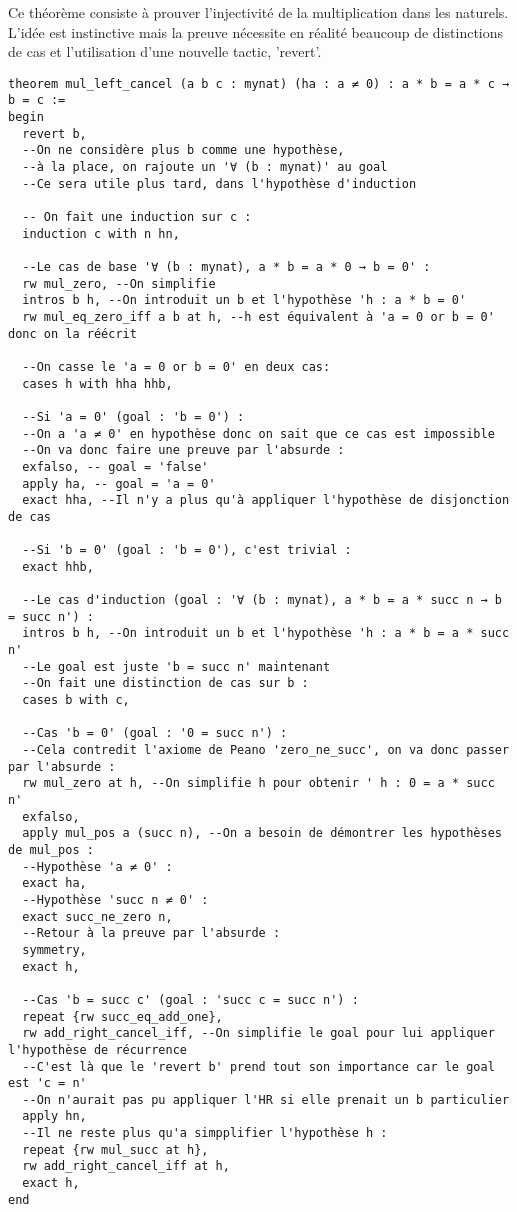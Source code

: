 Ce théorème consiste à prouver l'injectivité de la multiplication dans les naturels.
L'idée est instinctive mais la preuve nécessite en réalité beaucoup de distinctions de cas et l'utilisation d'une nouvelle tactic, 'revert'.
\begin{verbatim}
theorem mul_left_cancel (a b c : mynat) (ha : a ≠ 0) : a * b = a * c → b = c :=
begin
  revert b,
  --On ne considère plus b comme une hypothèse,
  --à la place, on rajoute un '∀ (b : mynat)' au goal
  --Ce sera utile plus tard, dans l'hypothèse d'induction
  
  -- On fait une induction sur c :
  induction c with n hn,

  --Le cas de base '∀ (b : mynat), a * b = a * 0 → b = 0' :
  rw mul_zero, --On simplifie
  intros b h, --On introduit un b et l'hypothèse 'h : a * b = 0'
  rw mul_eq_zero_iff a b at h, --h est équivalent à 'a = 0 or b = 0' donc on la réécrit
  
  --On casse le 'a = 0 or b = 0' en deux cas:
  cases h with hha hhb,
  
  --Si 'a = 0' (goal : 'b = 0') :
  --On a 'a ≠ 0' en hypothèse donc on sait que ce cas est impossible
  --On va donc faire une preuve par l'absurde :
  exfalso, -- goal = 'false'
  apply ha, -- goal = 'a = 0'
  exact hha, --Il n'y a plus qu'à appliquer l'hypothèse de disjonction de cas
  
  --Si 'b = 0' (goal : 'b = 0'), c'est trivial :
  exact hhb,

  --Le cas d'induction (goal : '∀ (b : mynat), a * b = a * succ n → b = succ n') :
  intros b h, --On introduit un b et l'hypothèse 'h : a * b = a * succ n'
  --Le goal est juste 'b = succ n' maintenant
  --On fait une distinction de cas sur b :
  cases b with c,

  --Cas 'b = 0' (goal : '0 = succ n') :
  --Cela contredit l'axiome de Peano 'zero_ne_succ', on va donc passer par l'absurde :
  rw mul_zero at h, --On simplifie h pour obtenir ' h : 0 = a * succ n'
  exfalso,
  apply mul_pos a (succ n), --On a besoin de démontrer les hypothèses de mul_pos :
  --Hypothèse 'a ≠ 0' :
  exact ha,
  --Hypothèse 'succ n ≠ 0' :
  exact succ_ne_zero n,
  --Retour à la preuve par l'absurde :
  symmetry,
  exact h,

  --Cas 'b = succ c' (goal : 'succ c = succ n') :
  repeat {rw succ_eq_add_one},
  rw add_right_cancel_iff, --On simplifie le goal pour lui appliquer l'hypothèse de récurrence
  --C'est là que le 'revert b' prend tout son importance car le goal est 'c = n'
  --On n'aurait pas pu appliquer l'HR si elle prenait un b particulier
  apply hn,
  --Il ne reste plus qu'a simpplifier l'hypothèse h :
  repeat {rw mul_succ at h},
  rw add_right_cancel_iff at h,
  exact h,
end
\end{verbatim}

